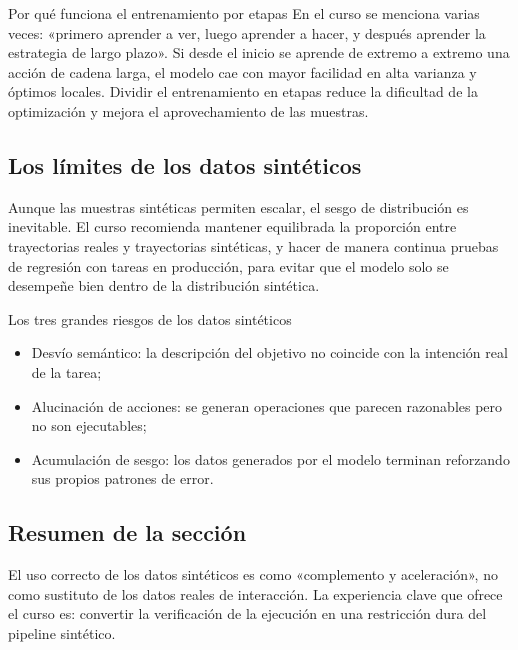 \begin{knowledgebox}{Por qué funciona el entrenamiento por etapas}
En el curso se menciona varias veces: «primero aprender a ver, luego aprender a hacer, y después aprender la estrategia de largo plazo». Si desde el inicio se aprende de extremo a extremo una acción de cadena larga, el modelo cae con mayor facilidad en alta varianza y óptimos locales. Dividir el entrenamiento en etapas reduce la dificultad de la optimización y mejora el aprovechamiento de las muestras.
\end{knowledgebox}

\subsection{Los límites de los datos sintéticos}
Aunque las muestras sintéticas permiten escalar, el sesgo de distribución es inevitable. El curso recomienda mantener equilibrada la proporción entre trayectorias reales y trayectorias sintéticas, y hacer de manera continua pruebas de regresión con tareas en producción, para evitar que el modelo solo se desempeñe bien dentro de la distribución sintética.

\begin{warningbox}{Los tres grandes riesgos de los datos sintéticos}
\begin{itemize}
    \item Desvío semántico: la descripción del objetivo no coincide con la intención real de la tarea;
    \item Alucinación de acciones: se generan operaciones que parecen razonables pero no son ejecutables;
    \item Acumulación de sesgo: los datos generados por el modelo terminan reforzando sus propios patrones de error.
\end{itemize}
\end{warningbox}

\subsection{Resumen de la sección}
El uso correcto de los datos sintéticos es como «complemento y aceleración», no como sustituto de los datos reales de interacción. La experiencia clave que ofrece el curso es: convertir la verificación de la ejecución en una restricción dura del pipeline sintético.
